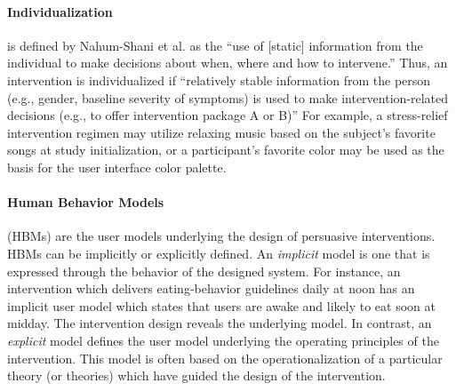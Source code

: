 \documentclass[runningheads,a4paper]{llncs}
\begin{document}
\paragraph{Individualization} is defined by Nahum-Shani et al. as the ``use of [static] information from the individual to make decisions about when, where and how to intervene.'' \cite{nahum2014}
Thus, an intervention is individualized if ``relatively stable information from the person (e.g., gender, baseline severity of symptoms) is used to make intervention-related decisions (e.g., to offer intervention package A or B)'' \cite{nahum2014}
For example, a stress-relief intervention regimen may utilize relaxing music based on the subject's favorite songs at study initialization, or a participant's favorite color may be used as the basis for the user interface color palette.

\paragraph{Human Behavior Models} (HBMs) are the user models underlying the design of persuasive interventions.
HBMs can be implicitly or explicitly defined.
An \emph{implicit} model is one that is expressed through the behavior of the designed system. 
For instance, an intervention which delivers eating-behavior guidelines daily at noon has an implicit user model which states that users are awake and likely to eat soon at midday.
The intervention design reveals the underlying model.
In contrast, an \emph{explicit} model  defines the user model underlying the operating principles of the intervention. This model is often based on the operationalization of a particular theory (or theories) which have guided the design of the intervention.
\end{document}
